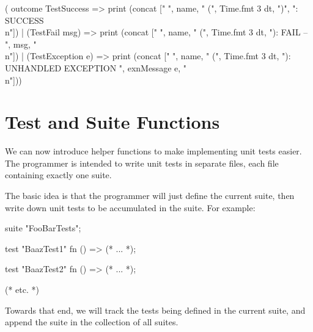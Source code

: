 \nwenddocs{}\endmoddef\nwstartdeflinemarkup{}\nwenddeflinemarkup
( outcome 
     TestSuccess => print (concat [" ",
                                   name,
                                   " (",
                                   Time.fmt 3 dt,
                                   ")",
                                   ": SUCCESS\\n"])
   | (TestFail msg) => print (concat [" ",
                                      name,
                                      " (",
                                      Time.fmt 3 dt,
                                      "): FAIL -- ",
                                      msg,
                                      "\\n"])
   | (TestException e) => print (concat [" ",
                                         name,
                                         " (",
                                         Time.fmt 3 dt,
                                         "): UNHANDLED EXCEPTION ",
                                         exnMessage e,
                                         "\\n"]))
\nwendcode{}\nwdocspar


\section{Test and Suite Functions}

We can now introduce helper functions to make implementing unit tests
easier. The programmer is intended to write unit tests in separate
files, each file containing exactly one suite.

The basic idea is that the programmer will just define the current
suite, then write down unit tests to be accumulated in the suite. For
example:
\begin{sml}
suite "FooBarTests";

test "BaazTest1" fn () => (* ... *);

test "BaazTest2" fn () => (* ... *);

(* etc. *)
\end{sml}
Towards that end, we will track the tests being defined in the current
suite, and append the suite in the collection of all suites.

